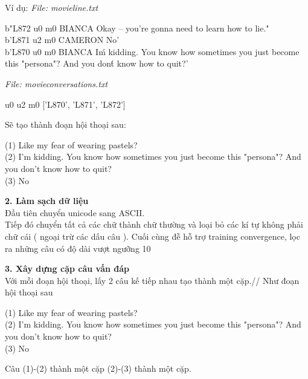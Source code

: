 Ví dụ:
\textit{File: movie\detokenize{_}line.txt}
\begin{displayquote}
b"L872 \detokenize{+++$+++}  u0 \detokenize{+++$+++}  m0 \detokenize{+++$+++}  BIANCA \detokenize{+++$+++}  Okay -- you're gonna need to learn how to lie.\n" \\
b'L871 \detokenize{+++$+++}  u2 \detokenize{+++$+++}  m0 \detokenize{+++$+++}  CAMERON \detokenize{+++$+++}  No\n' \\
b'L870 \detokenize{+++$+++}  u0 \detokenize{+++$+++}  m0 \detokenize{+++$+++}  BIANCA \detokenize{+++$+++}  I\'m kidding.  You know how sometimes you just become this
"persona"?  And you don\'t know how to quit?\n' \\
\end{displayquote}
\textit{File: movie\detokenize{_}conversations.txt}
\begin{displayquote}
    u0 \detokenize{+++$+++} u2 \detokenize{+++$+++} m0 \detokenize{+++$+++} ['L870', 'L871', 'L872']
\end{displayquote}

Sẽ tạo thành đoạn hội thoại sau:
\begin{displayquote}
    (1) Like my fear of wearing pastels? \\
    (2) I'm kidding.  You know how sometimes you just become this "persona"?  And you don't know how to quit? \\
    (3) No \\
\end{displayquote}

\textbf{2. Làm sạch dữ liệu} \\

Đầu tiên chuyển unicode sang ASCII.\\
Tiếp đó chuyển tất cả các chữ thành chữ thường và loại bỏ các kí tự không phải chữ cái ( ngoại trừ các dấu câu ).
Cuối cùng đễ hỗ trợ training convergence, lọc ra những câu có độ dài vượt ngưỡng 10

\textbf{3. Xây dựng cặp câu vấn đáp} \\
Với mỗi đoạn hội thoại, lấy 2 câu kế tiếp nhau tạo thành một cặp.//
Như đoạn hội thoại sau
\begin{displayquote}
    (1) Like my fear of wearing pastels? \\
    (2) I'm kidding.  You know how sometimes you just become this "persona"?  And you don't know how to quit? \\
    (3) No \\
\end{displayquote}
Câu (1)-(2) thành một cặp (2)-(3) thành một cặp.

